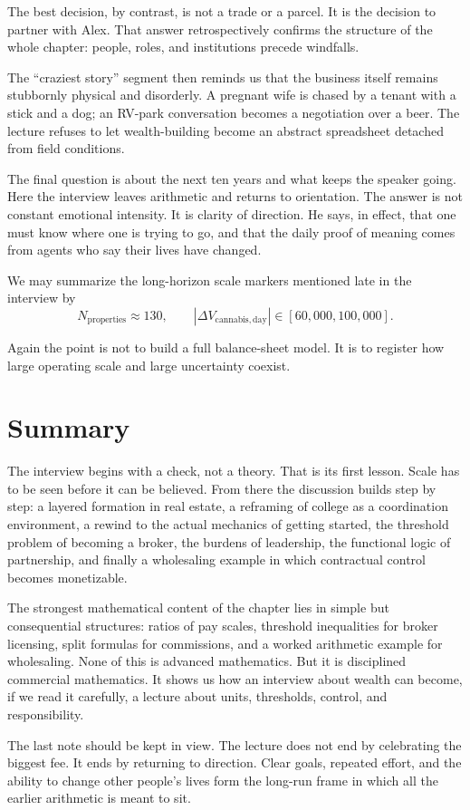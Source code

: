 The best decision, by contrast, is not a trade or a parcel. It is the decision to partner with Alex. That answer retrospectively confirms the structure of the whole chapter: people, roles, and institutions precede windfalls.

The ``craziest story'' segment then reminds us that the business itself remains stubbornly physical and disorderly. A pregnant wife is chased by a tenant with a stick and a dog; an RV-park conversation becomes a negotiation over a beer. The lecture refuses to let wealth-building become an abstract spreadsheet detached from field conditions.

The final question is about the next ten years and what keeps the speaker going. Here the interview leaves arithmetic and returns to orientation. The answer is not constant emotional intensity. It is clarity of direction. He says, in effect, that one must know where one is trying to go, and that the daily proof of meaning comes from agents who say their lives have changed.

We may summarize the long-horizon scale markers mentioned late in the interview by
\begin{equation}
N_{\mathrm{properties}} \approx 130,
\qquad
|\Delta V_{\mathrm{cannabis,day}}| \in [60{,}000,100{,}000].
\end{equation}

Again the point is not to build a full balance-sheet model. It is to register how large operating scale and large uncertainty coexist.

\section{Summary}

The interview begins with a check, not a theory. That is its first lesson. Scale has to be seen before it can be believed. From there the discussion builds step by step: a layered formation in real estate, a reframing of college as a coordination environment, a rewind to the actual mechanics of getting started, the threshold problem of becoming a broker, the burdens of leadership, the functional logic of partnership, and finally a wholesaling example in which contractual control becomes monetizable.

The strongest mathematical content of the chapter lies in simple but consequential structures: ratios of pay scales, threshold inequalities for broker licensing, split formulas for commissions, and a worked arithmetic example for wholesaling. None of this is advanced mathematics. But it is disciplined commercial mathematics. It shows us how an interview about wealth can become, if we read it carefully, a lecture about units, thresholds, control, and responsibility.

The last note should be kept in view. The lecture does not end by celebrating the biggest fee. It ends by returning to direction. Clear goals, repeated effort, and the ability to change other people's lives form the long-run frame in which all the earlier arithmetic is meant to sit.